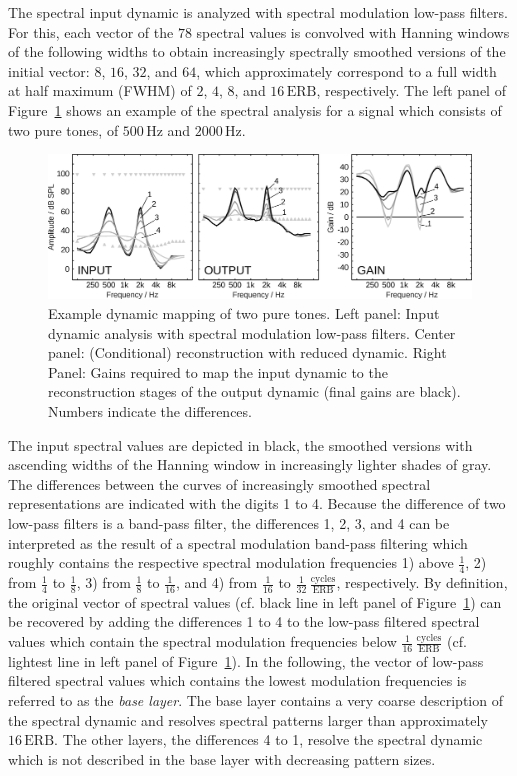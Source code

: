 \documentclass[10pt,a4paper,twocolumn]{article}
\begin{document}
The spectral input dynamic is analyzed with spectral modulation low-pass filters.
%
For this, each vector of the $78$ spectral values is convolved with Hanning windows of the following widths to obtain increasingly spectrally smoothed versions of the initial vector: $8$, $16$, $32$, and $64$, which approximately correspond to a full width at half maximum (FWHM) of $2$, $4$, $8$, and $16\,\text{ERB}$, respectively.
%
The left panel of Figure~\ref{fig:9} shows an example of the spectral analysis for a signal which consists of two pure tones, of $500\,\text{Hz}$ and $2000\,\text{Hz}$.
%
\begin{figure}
	\centerline{\includegraphics[width=.80\textwidth]{images/details-dynamic-layers}}
	\caption{Example dynamic mapping of two pure tones. Left panel: Input dynamic analysis with spectral modulation low-pass filters. Center panel: (Conditional) reconstruction with reduced dynamic. Right Panel: Gains required to map the input dynamic to the reconstruction stages of the output dynamic (final gains are black). Numbers indicate the differences.}
	\label{fig:9}
\end{figure}
%
The input spectral values are depicted in black, the smoothed versions with ascending widths of the Hanning window in increasingly lighter shades of gray.
%
The differences between the curves of increasingly smoothed spectral representations are indicated with the digits 1 to 4.
%
Because the difference of two low-pass filters is a band-pass filter, the differences 1, 2, 3, and 4 can be interpreted as the result of a spectral modulation band-pass filtering which roughly contains the respective spectral modulation frequencies 1) above $\frac{1}{4}$, 2) from $\frac{1}{4}$ to $\frac{1}{8}$, 3) from $\frac{1}{8}$ to $\frac{1}{16}$, and 4) from $\frac{1}{16}$ to $\frac{1}{32}$\,$\frac{\text{cycles}}{\text{ERB}}$, respectively.
%
By definition, the original vector of spectral values (cf. black line in left panel of Figure~\ref{fig:9}) can be recovered by adding the differences 1 to 4 to the low-pass filtered spectral values which contain the spectral modulation frequencies below $\frac{1}{16}$\,$\frac{\text{cycles}}{\text{ERB}}$ (cf. lightest line in left panel of Figure~\ref{fig:9}).
%
In the following, the vector of low-pass filtered spectral values which contains the lowest modulation frequencies is referred to as the \emph{base layer}.
%
The base layer contains a very coarse description of the spectral dynamic and resolves spectral patterns larger than approximately $16\,\text{ERB}$.
%
The other layers, the differences 4 to 1, resolve the spectral dynamic which is not described in the base layer with decreasing pattern sizes.
\end{document}
